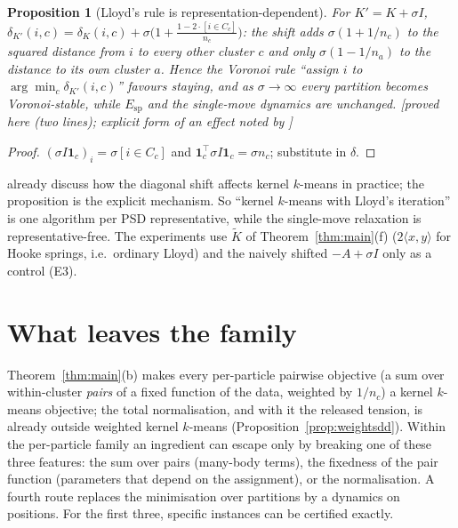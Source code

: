 \documentclass[11pt,a4paper]{article}
\theoremstyle{plain}
\newtheorem{proposition}[theorem]{Proposition}
\theoremstyle{definition}
\theoremstyle{remark}
\newcommand{\spec}{\mathrm{sp}}
\newcommand{\one}{\mathbf 1}
\newcommand{\status}[1]{\textsf{\small [#1]}}
\begin{document}
\begin{proposition}[Lloyd's rule is representation-dependent]\label{prop:shift}
For $K'=K+\sigma I$, $\delta_{K'}(i,c)=\delta_K(i,c)+\sigma\bigl(1+\tfrac{1-2\cdot[i\in C_c]}{n_c}\bigr)$: the shift adds $\sigma(1+1/n_c)$ to the squared distance from $i$ to every other cluster $c$ and only $\sigma(1-1/n_a)$ to the distance to its own cluster $a$. Hence the Voronoi rule ``assign $i$ to $\arg\min_c\delta_{K'}(i,c)$'' favours staying, and as $\sigma\to\infty$ every partition becomes Voronoi-stable, while $E_\spec$ and the single-move dynamics are unchanged. \status{proved here (two lines); explicit form of an effect noted by \citet{dhillon2005tr,dhillon2007}}
\end{proposition}
\begin{proof}
$(\sigma I\one_c)_i=\sigma[i\in C_c]$ and $\one_c^{\!\top}\sigma I\one_c=\sigma n_c$; substitute in $\delta$.
\end{proof}
\noindent \citet{dhillon2005tr,dhillon2007} already discuss how the diagonal shift affects kernel $k$-means in practice; the proposition is the explicit mechanism. So ``kernel $k$-means with Lloyd's iteration'' is one algorithm per PSD representative, while the single-move relaxation is representative-free. The experiments use $\widetilde K$ of Theorem~\ref{thm:main}(f) ($2\langle x,y\rangle$ for Hooke springs, i.e.\ ordinary Lloyd) and the naively shifted $-A+\sigma I$ only as a control (E3).

\section{What leaves the family}\label{sec:escape}

Theorem~\ref{thm:main}(b) makes every per-particle pairwise objective (a sum over within-cluster \emph{pairs} of a fixed function of the data, weighted by $1/n_c$) a kernel $k$-means objective; the total normalisation, and with it the released tension, is already outside weighted kernel $k$-means (Proposition~\ref{prop:weightsdd}). Within the per-particle family an ingredient can escape only by breaking one of these three features: the sum over pairs (many-body terms), the fixedness of the pair function (parameters that depend on the assignment), or the normalisation. A fourth route replaces the minimisation over partitions by a dynamics on positions. For the first three, specific instances can be certified exactly.
\end{document}
